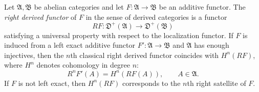 Let $\mathfrak{A}, \mathfrak{B}$ be abelian categories and let $F : \mathfrak{A} \to \mathfrak{B}$ be an additive functor. The {\it right derived functor} of $F$ in the sense of derived categories is a functor
\[
RF : \mathfrak{D}^+(\mathfrak{A}) \to \mathfrak{D}^+(\mathfrak{B})
\]
satisfying a universal property with respect to the localization functor. If $F$ is induced from a left exact additive functor $F' : \mathfrak{A} \to \mathfrak{B}$ and $\mathfrak{A}$ has enough injectives, then the $n$th classical right derived functor coincides with $H^n(RF)$, where $H^n$ denotes cohomology in degree $n$:
\[
R^n F'(A) = H^n(RF(A)), \qquad A \in \mathfrak{A}.
\]
If $F$ is not left exact, then $H^n(RF)$ corresponds to the $n$th right satellite of $F$.
